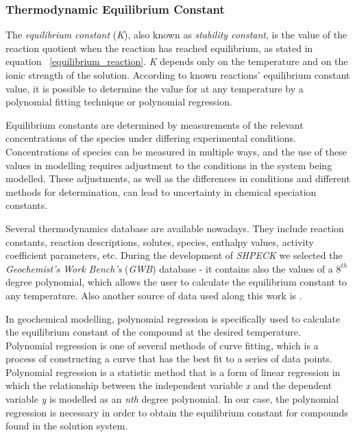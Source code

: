 \subsubsection{Thermodynamic Equilibrium Constant}
The \emph{equilibrium constant} (\emph{K}), also known as \emph{stability constant}, is the value of the reaction quotient when the reaction has reached equilibrium, as stated in equation ~\ref{equilibrium_reaction}. \emph{K} depends only on the temperature and on the ionic strength of the solution. According to known reactions' equilibrium constant value, it is possible to determine the value for at any temperature by a polynomial fitting technique or polynomial regression.

Equilibrium constants are determined by measurements of the relevant concentrations of the species under differing experimental conditions. Concentrations of species can be measured in multiple ways, and the use of these values in modelling requires adjustment to the conditions in the system being modelled. These adjustments, as well as the differences in conditions and different methods for determination, can lead to uncertainty in chemical speciation constants.

Several thermodynamics database are available nowadays. They include reaction constants, reaction descriptions, solutes, species, enthalpy values, activity coefficient parameters, etc. During the development of \emph{SHPECK} we selected the \emph{Geochemist's Work Bench's} (\emph{GWB}) database - it contains also the values of a $8^{th}$ degree polynomial, which allows the user to calculate the equilibrium constant to any temperature. Also another source of data used along this work is \cite{Palandri:04}.

In geochemical modelling, polynomial regression is specifically used to calculate the equilibrium constant of the compound at the desired temperature. 
Polynomial regression is one of several methods of curve fitting, which is a process of constructing a curve that has the best fit to a series of data points. Polynomial regression is a statistic method that is a form of linear regression in which the relationship between the independent variable \emph{x} and the dependent variable \emph{y} is modelled as an \emph{nth} degree polynomial. In our case, the polynomial regression is necessary in order to obtain the equilibrium constant for compounds found in the solution system.


